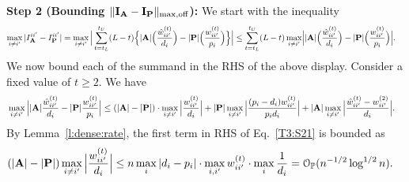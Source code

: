 \documentclass[10pt,journal,compsoc]{IEEEtran}
\newcommand{\op}{\mathcal{O}_{\mathbb{P}}}
\newcommand{\ee}{\end{aligned} \end{equation}}
\newcommand{\bee}{\begin{equation}\begin{aligned}}
\newcommand{\M}[1]{{{\mathbf{\MakeUppercase{#1}}}}}
\numberwithin{equation}{section}
\begin{document}
\noindent\textbf{Step 2 (Bounding $\|\M I_{\M A} - \M I_{\M P}\|_{\max,\mathrm{off}}$):} 
We start with the inequality
\bee\label{T2:S22}
\max_{i \neq {i'}}|I_{\M A}^{ii'} - I_{\M P}^{ii'}| 
&= \max_{i \neq
  {i'}}\Big|\sum_{t = t_L}^{t_U}(L - t)\Big\{|\M
A|\Big(\frac{\hat{w}_{ii'}^{(t)}}{d_i}\Big)-|\M P|\Big(\frac{{w}_{ii'}^{(t)}}{p_i}\Big)\Big\}\Big|
\leq\sum_{t = t_L}^{t_U} (L - t) \max_{i \neq
  {i'}}\Bigl||\M A|\Big(\frac{\hat{w}_{ii'}^{(t)}}{d_i}\Big)-|\M P| \Big(\frac{{w}_{ii'}^{(t)}}{p_i}\Big)\Big|.
\ee
We now bound each of the summand in the RHS of the above
display. Consider a fixed value of $t \geq 2$. %
We have
\bee\label{T3:S21}
&\max_{i \neq {i'}}\Big||\M
A|\frac{\hat{w}_{ii'}^{(t)}}{d_i}- |\M P|
\frac{{w}_{ii'}^{(t)}}{p_i}\Big| 
\leq (|\M A| - |\M P|) \cdot \max_{i \neq
  {i'}}\Big| \frac{w^{(t)}_{ii'}}{d_i}\Big| + |\M P| \max_{i \neq
  {i'}}\Big| \frac{(p_i - d_i) w^{(t)}_{ii'}}{p_i d_i} \Big| + |\M A| \max_{i \neq {i'}}\Big|\frac{\hat{w}_{ii'}^{(t)} - w_{ii'}^{(2)}}{d_i}\Big|.
\ee
By Lemma~\ref{l:dense:rate}, the first term in RHS of Eq.~\eqref{T3:S21} is bounded as
\bee\label{T3:S23}
&(|\M A| - |\M P|) \max_{i \neq {i'}} \Big|
\frac{w^{(t)}_{ii'}}{d_i}\Big| 
\leq n\max_{i} |d_i - p_i|
\cdot \max_{i,{i'}} w_{ii'}^{(t)} \cdot \max_{i}\frac{1}{d_i} 
=
\op(n^{-1/2}\log^{1/2}{n}).
\ee
\end{document}
